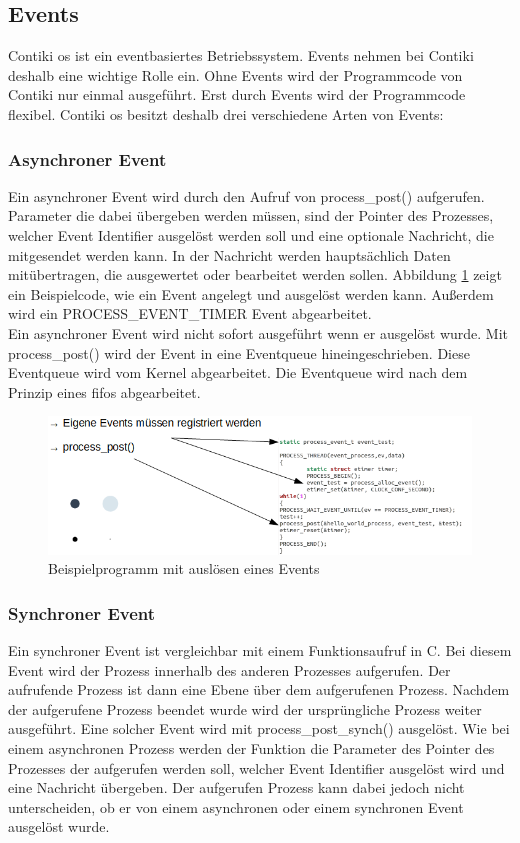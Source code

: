 	\subsection{Events}
	Contiki \ac{os} ist ein eventbasiertes Betriebssystem. Events nehmen bei Contiki deshalb eine wichtige Rolle ein. Ohne Events wird der Programmcode von Contiki nur einmal ausgeführt. Erst durch Events wird der Programmcode flexibel. Contiki \ac{os} besitzt deshalb drei verschiedene Arten von Events:
	
	\subsubsection{Asynchroner Event}
	Ein asynchroner Event wird durch den Aufruf von process\_post() aufgerufen. Parameter die dabei übergeben werden müssen, sind der Pointer des Prozesses, welcher Event Identifier ausgelöst werden soll und eine optionale Nachricht, die mitgesendet werden kann. In der Nachricht werden hauptsächlich Daten mitübertragen, die ausgewertet oder bearbeitet werden sollen. Abbildung \ref{BeispielProgramm} zeigt ein Beispielcode, wie ein Event angelegt und ausgelöst werden kann. Außerdem wird ein PROCESS\_EVENT\_TIMER Event abgearbeitet.\\
	Ein asynchroner Event wird nicht sofort ausgeführt wenn er ausgelöst wurde. Mit process\_post() wird der Event in eine Eventqueue hineingeschrieben. Diese Eventqueue wird vom Kernel abgearbeitet. Die Eventqueue wird nach dem Prinzip eines \ac{fifo}s abgearbeitet. 
	
	\begin{figure}
		\centering
		\includegraphics[scale=0.8]{Grafiken-Julian/ContikiEventsCodebeispiel.png}
		\caption{Beispielprogramm mit auslösen eines Events}
		\label{BeispielProgramm}
	\end{figure}
	
	\subsubsection{Synchroner Event}
	Ein synchroner Event ist vergleichbar mit einem Funktionsaufruf in C. Bei diesem Event wird der Prozess innerhalb des anderen Prozesses aufgerufen. Der aufrufende Prozess ist dann eine Ebene über dem aufgerufenen Prozess. Nachdem der aufgerufene Prozess beendet wurde wird der ursprüngliche Prozess weiter ausgeführt. Eine solcher Event wird mit process\_post\_synch() ausgelöst. Wie bei einem asynchronen Prozess werden der Funktion die Parameter des Pointer des Prozesses der aufgerufen werden soll, welcher Event Identifier ausgelöst wird und eine Nachricht übergeben. Der aufgerufen Prozess kann dabei jedoch nicht unterscheiden, ob er von einem asynchronen oder einem synchronen Event ausgelöst wurde.
